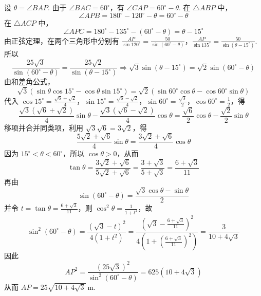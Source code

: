 \begin{solution}
设 \( \theta=\angle BAP\). 由于 \( \angle BAC=60^\circ\)，有 \( \angle CAP=60^\circ-\theta\). 在 \( \triangle ABP\) 中，
\[
\angle APB=180^\circ-120^\circ-\theta=60^\circ-\theta
\]
在 \( \triangle ACP\) 中，
\[
\angle APC=180^\circ-135^\circ-\left(60^\circ-\theta\right)=\theta-15^\circ
\]
由正弦定理，在两个三角形中分别有
\(\frac{AP}{\sin120^\circ}=\frac{50}{\sin\left(60^\circ-\theta\right)}\)，\(\frac{AP}{\sin135^\circ}=\frac{50}{\sin\left(\theta-15^\circ\right)}\).
所以
\[
\frac{25\sqrt3}{\sin\left(60^\circ-\theta\right)}=\frac{25\sqrt2}{\sin\left(\theta-15^\circ\right)}
\Longrightarrow \sqrt3\sin\left(\theta-15^\circ\right)=\sqrt2\sin\left(60^\circ-\theta\right)
\]
由和差角公式，
\[
\sqrt3\left(\sin\theta\cos15^\circ-\cos\theta\sin15^\circ\right)
=\sqrt2\left(\sin60^\circ\cos\theta-\cos60^\circ\sin\theta\right)
\]
代入 \(\cos15^\circ=\frac{\sqrt6+\sqrt2}{4}\)，\(\sin15^\circ=\frac{\sqrt6-\sqrt2}{4}\)，\(\sin60^\circ=\frac{\sqrt3}{2}\)，\(\cos60^\circ=\frac{1}{2}\)，得
\[
    \frac{\sqrt3\left(\sqrt6+\sqrt2\right)}{4}\sin\theta-\frac{\sqrt3\left(\sqrt6-\sqrt2\right)}{4}\cos\theta
=\frac{\sqrt6}{2}\cos\theta-\frac{\sqrt2}{2}\sin\theta
\]
移项并合并同类项，利用 \(\sqrt3\sqrt6=3\sqrt2\)，得
\[
\frac{5\sqrt2+\sqrt6}{4}\sin\theta=\frac{3\sqrt2+\sqrt6}{4}\cos\theta
\]
因为 \(15^\circ<\theta<60^\circ\)，所以 \(\cos\theta>0\)，从而
\[
\tan\theta=\frac{3\sqrt2+\sqrt6}{5\sqrt2+\sqrt6}
=\frac{3+\sqrt3}{5+\sqrt3}
=\frac{6+\sqrt3}{11}
\]
再由
\[
\sin\left(60^\circ-\theta\right)=\frac{\sqrt3\cos\theta-\sin\theta}{2}
\]
并令 \(t=\tan\theta=\frac{6+\sqrt3}{11}\)，则
\(\cos^2\theta=\frac{1}{1+t^2}\)，故
\[
\sin^2\left(60^\circ-\theta\right)
=\frac{\left(\sqrt3-t\right)^2}{4\left(1+t^2\right)}
=\frac{\left(\sqrt3-\frac{6+\sqrt3}{11}\right)^2}{4\left(1+\left(\frac{6+\sqrt3}{11}\right)^2\right)}
=\frac{3}{10+4\sqrt3}
\]
因此
\[
    AP^2=\frac{\left(25\sqrt3\right)^2}{\sin^2\left(60^\circ-\theta\right)}=625\left(10+4\sqrt3\right)
\]
从而 \( AP=25\sqrt{10+4\sqrt3}\mathrm{~m}\).
\end{solution}
